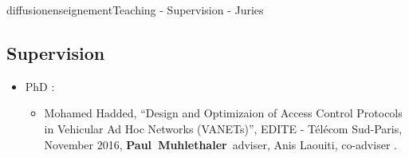 \documentclass{ra2016}
\newcommand{\paul}             {\textbf{Paul~Muhlethaler}}
\newcommand{\pascale}          {\textbf{Pascale~Minet}}
\begin{document}
\begin{module}{diffusion}{enseignement}{Teaching - Supervision - Juries}
\subsection {Supervision}

\begin{itemize}
    \item PhD : 
        \begin{itemize}
            \item Mohamed Hadded, ``Design and Optimizaion of Access Control Protocols in Vehicular Ad Hoc Networks (VANETs)'', EDITE - T\'el\'ecom Sud-Paris, November 2016, \paul~adviser, Anis Laouiti, co-adviser .
        \end{itemize}
\end{itemize}


\end{module}
\end{document}
